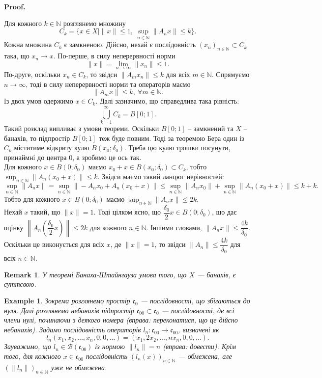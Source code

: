 \documentclass[a4paper, 10pt]{article}
\makeatletter
\theoremstyle{theoremdd}
\theoremstyle{theoremdd}
\theoremstyle{theoremdd}
\theoremstyle{theoremdd}
\newtheorem{example}[theorem]{Example}
\theoremstyle{theoremdd}
\theoremstyle{theoremdd}
\newtheorem{remark}[theorem]{Remark}
\theoremstyle{theoremdd}
\theoremstyle{theoremdd}
\renewenvironment{proof}[1][Proof.\\]{\par
\pushQED{\hfill \qed}%
\normalfont \topsep6\p@\@plus6\p@\relax
\trivlist
\item\relax
{\bfseries
#1\@addpunct{.}}\hspace\labelsep\ignorespaces
}{%
\popQED\endtrivlist\@endpefalse
}
\makeatother
\begin{document}
\begin{proof}
Для кожного $k \in \mathbb{N}$ розглянемо множину
\[
C_k = \{ x \in X \mid \|x\| \leq 1,\ \sup_{n \in \mathbb{N}} \| A_n x\| \leq k \}.
\]
Кожна множина $C_k$ є замкненою. Дійсно, нехай є послідовність $(x_n)_{n \in \mathbb{N}} \subset C_k$ така, що $x_n \to x$. По-перше, в силу неперервності норми
\[
\|x \| = \lim_{n \to \infty} \|x_n\| \leq 1.
\]
По-друге, оскільки $x_n \in C_k$, то звідси $\| A_m x_n \| \leq k$ для всіх $m \in \mathbb{N}$. Спрямуємо $n \to \infty$, тоді в силу неперервності норми та операторів маємо
\[
\| A_m x \| \leq k,\ \forall m \in \mathbb{N}.
\]
Із двох умов одержимо $x \in C_k$. Далі зазначимо, що справедлива така рівність:
\[
\bigcup_{k =1}^\infty C_k = B[0;1].
\]
Такий розклад випливає з умови теореми. Оскільки $B[0;1]$ -- замкнений та $X$ -- банахів, то підпростір $B[0;1]$ теж буде повним. Тоді за теоремою Бера один із $C_k$ міститиме відкриту кулю $B(x_0;\delta_0)$. Треба цю кулю трошки посунути, принаймні до центра $0$, а зробимо це ось так.\\
Для кожного $x \in B(0;\delta_0)$ маємо $x_0 + x \in B(x_0;\delta_0) \subset C_k$, тобто $\displaystyle\sup_{n \in \mathbb{N}} \|A_n(x_0+x)\| \leq k$. Звідси маємо такий ланцюг нерівностей:
\[
\sup_{n \in \mathbb{N}} \|A_n x\| = \sup_{n \in \mathbb{N}} \| -A_n x_0 + A_n (x_0 + x) \| \leq \sup_{n \in \mathbb{N}} \| A_n x_0\| + \sup_{n \in \mathbb{N}} \| A_n(x_0+x)\| \leq k + k.
\]
Тобто для кожного $x \in B(0;\delta_0)$ маємо $\displaystyle\sup_{n \in \mathbb{N}} \| A_n x \| \leq 2k$.\\
Нехай $x$ такий, що $\|x\| = 1$. Тоді цілком ясно, що $\dfrac{\delta_0}{2}x \in B(0;\delta_0)$, що дає оцінку $\displaystyle \left\| A_n \left( \dfrac{\delta_0}{2} x\right) \right\| \leq 2k$ для кожного $n \in \mathbb{N}$. Іншими словами, $\| A_n x \| \leq \dfrac{4k}{\delta_0}$. Оскільки це виконується для всіх $x$, де $\|x\| = 1$, то звідси $\|A_n\| \leq \dfrac{4k}{\delta_0}$ для всіх $n \in \mathbb{N}$.
\end{proof}

\begin{remark}
У теоремі Банаха-Штайнгауза умова того, що $X$ --- банахів, є суттєвою.
\end{remark}

\begin{example}
Зокрема розглянемо простір $\mathfrak{c}_0$ --- послідовності, що збігаються до нуля. Далі розглянемо небанахів підпростір $\mathfrak{c}_{00} \subset \mathfrak{c}_0$ --- послідовності, де всі члени нулі, починаючи з деякого номера (\textit{вправа: переконатися, що це дійсно небанахів}). Задамо послідовність операторів $l_n \colon \mathfrak{c}_{00} \to \mathfrak{c}_{00}$, визначені як
\[
l_n(x_1,x_2,\dots,x_n,0,0,\dots) = (x_1, 2x_2, \dots, n x_n, 0, 0, \dots).
\]
Зауважимо, що $l_n \in \mathcal{B}(\mathfrak{c}_{00})$ із нормою $\|l_n\| = n$ (\textit{вправа: довести}). Крім того, для кожного $x \in \mathfrak{c}_{00}$ послідовність $(l_n(x))_{n\in \mathbb{N}}$ --- обмежена, але $(\|l_n\|)_{n\in \mathbb{N}}$ уже не обмежена.

\end{example}
\end{document}
